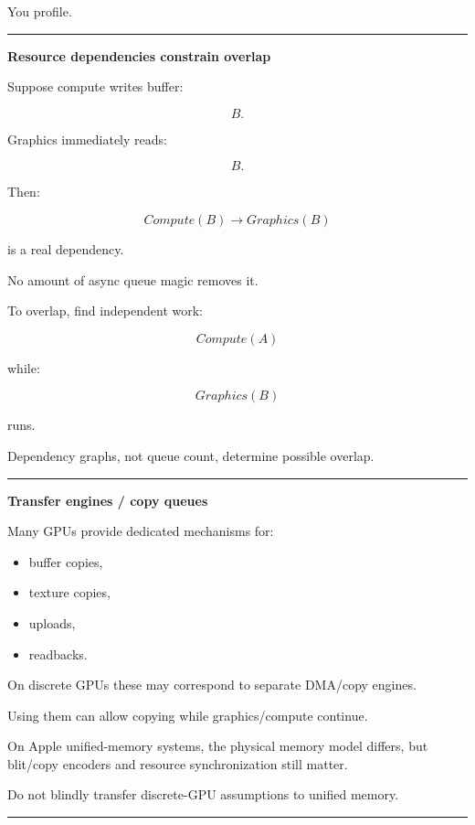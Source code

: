 You profile.

\begin{center}\rule{0.5\linewidth}{0.5pt}\end{center}

\textbf{Resource dependencies constrain overlap}

Suppose compute writes buffer:

\[
B.
\]

Graphics immediately reads:

\[
B.
\]

Then:

\[
Compute(B)
\rightarrow
Graphics(B)
\]

is a real dependency.

No amount of async queue magic removes it.

To overlap, find independent work:

\[
Compute(A)
\]

while:

\[
Graphics(B)
\]

runs.

Dependency graphs, not queue count, determine possible overlap.

\begin{center}\rule{0.5\linewidth}{0.5pt}\end{center}

\textbf{Transfer engines / copy queues}

Many GPUs provide dedicated mechanisms for:

\begin{itemize}
\tightlist
\item
  buffer copies,
\item
  texture copies,
\item
  uploads,
\item
  readbacks.
\end{itemize}

On discrete GPUs these may correspond to separate DMA/copy engines.

Using them can allow copying while graphics/compute continue.

On Apple unified-memory systems, the physical memory model differs, but blit/copy encoders and resource synchronization still matter.

Do not blindly transfer discrete-GPU assumptions to unified memory.

\begin{center}\rule{0.5\linewidth}{0.5pt}\end{center}

